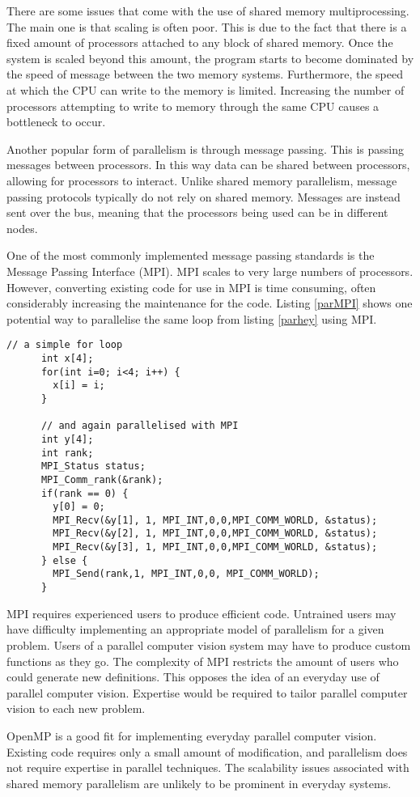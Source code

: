 \documentclass[../main.tex]{subfiles}
\begin{document}
    There are some issues that come with the use of shared memory multiprocessing.
    The main one is that scaling is often poor.
    This is due to the fact that there is a fixed amount of processors attached to any block of shared memory.
    Once the system is scaled beyond this amount, the program starts to become dominated by the speed of message between the two memory systems.
    Furthermore, the speed at which the CPU can write to the memory is limited.
    Increasing the number of processors attempting to write to memory through the same CPU causes a bottleneck to occur.

    Another popular form of parallelism is through message passing.
    This is passing messages between processors.
    In this way data can be shared between processors, allowing for processors to interact.
    Unlike shared memory parallelism, message passing protocols typically do not rely on shared memory.
    Messages are instead sent over the bus, meaning that the processors being used can be in different nodes.

    One of the most commonly implemented message passing standards is the Message Passing Interface (MPI).
    MPI scales to very large numbers of processors.
    However, converting existing code for use in MPI is time consuming, often considerably increasing the maintenance for the code.
    Listing \ref{parMPI} shows one potential way to parallelise the same loop from listing \ref{parhey} using MPI.
    \begin{lstlisting}[caption = 'A simple loop parallelised with MPI', label=parMPI]
      // a simple for loop
      int x[4];
      for(int i=0; i<4; i++) {
        x[i] = i;
      }

      // and again parallelised with MPI
      int y[4];
      int rank;
      MPI_Status status;
      MPI_Comm_rank(&rank);
      if(rank == 0) {
        y[0] = 0;
        MPI_Recv(&y[1], 1, MPI_INT,0,0,MPI_COMM_WORLD, &status);
        MPI_Recv(&y[2], 1, MPI_INT,0,0,MPI_COMM_WORLD, &status);
        MPI_Recv(&y[3], 1, MPI_INT,0,0,MPI_COMM_WORLD, &status);
      } else {
        MPI_Send(rank,1, MPI_INT,0,0, MPI_COMM_WORLD);
      }
    \end{lstlisting}

    MPI requires experienced users to produce efficient code.
    Untrained users may have difficulty implementing an appropriate model of parallelism for a given problem.
    Users of a parallel computer vision system may have to produce custom functions as they go.
    The complexity of MPI restricts the amount of users who could generate new definitions.
    This opposes the idea of an everyday use of parallel computer vision.
    Expertise would be required to tailor parallel computer vision to each new problem.

    OpenMP is a good fit for implementing everyday parallel computer vision.
    Existing code requires only a small amount of  modification, and parallelism does not require expertise in parallel techniques.
    The scalability issues associated with shared memory parallelism are unlikely to be prominent in everyday systems.
  \biblio
\end{document}
